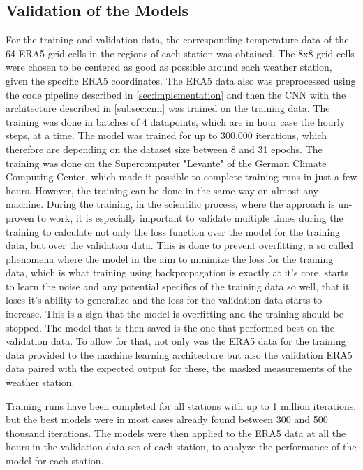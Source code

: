 

\subsection{Validation of the Models}

For the training and validation data, the corresponding temperature data of the 64 ERA5 grid cells in the regions of each station was obtained. The 8x8 grid cells were chosen to be centered as good as possible around each weather station, given the specific ERA5 coordinates. The ERA5 data also was preprocessed using the code pipeline described in \autoref{sec:implementation} and then the CNN with the architecture described in \autoref{subsec:cnn} was trained on the training data. The training was done in batches of 4 datapoints, which are in hour case the hourly steps, at a time. The model was trained for up to 300,000 iterations, which therefore are depending on the dataset size between 8 and 31 epochs. The training was done on the Supercomputer "Levante" of the German Climate Computing Center, which made it possible to complete training runs in just a few hours. However, the training can be done in the same way on almost any machine. During the training, in the scientific process, where the approach is un-proven to work, it is especially important to validate multiple times during the training to calculate not only the loss function over the model for the training data, but over the validation data. This is done to prevent overfitting, a so called phenomena where the model in the aim to minimize the loss for the training data, which is what training using backpropagation is exactly at it's core, starts to learn the noise and any potential specifics of the training data so well, that it loses it's ability to generalize and the loss for the validation data starts to increase. This is a sign that the model is overfitting and the training should be stopped. The model that is then saved is the one that performed best on the validation data. To allow for that, not only was the ERA5 data for the training data provided to the machine learning architecture but also the validation ERA5 data paired with the expected output for these, the masked measurements of the weather station.

Training runs have been completed for all stations with up to 1 million iterations, but the best models were in most cases already found between 300 and 500 thousand iterations. The models were then applied to the ERA5 data at all the hours in the validation data set of each station, to analyze the performance of the model for each station. 

